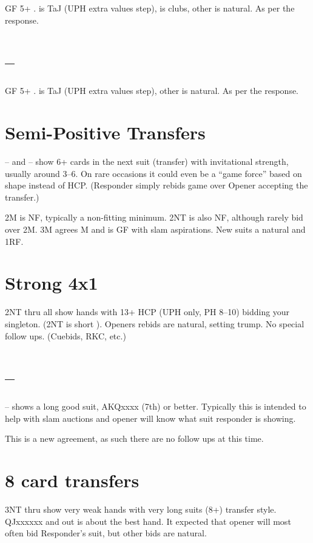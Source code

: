 \documentclass[tom-ari]{subfile}
\begin{document}
	
	GF 5+ \heartsuit.   is TaJ (UPH extra values step),  is clubs, other is natural.  As per the  response.
	
	\section[1C--2C]{--}
	
	
	GF 5+ \diamondsuit.   is TaJ (UPH extra values step), other is natural.  As per the  response. 
	
	\section{Semi-Positive Transfers}
	
	-- and -- show 6+ cards in the next suit (transfer) with invitational strength, usually around 3--6.  On rare occasions it could even be a ``game force'' based on shape instead of HCP.  (Responder simply rebids game over Opener accepting the transfer.)
	
	2M is NF, typically a non-fitting minimum.  2NT is also NF, although rarely bid over 2M.  3M agrees M and is GF with slam aspirations. New suits a natural and 1RF.
	
	\section{Strong 4x1}
	
	2NT thru  all show  hands with 13+ HCP (UPH only, PH 8--10) bidding your singleton. (2NT is short \spadesuit). Openers rebids are natural, setting trump.  No special follow ups.  (Cuebids, RKC, etc.)
	  
 	\section[1C--3S]{--}
 	
 	-- shows a long good suit, AKQxxxx (7th) or better.  Typically this is intended to help with slam auctions and opener will know what suit responder is showing.
 	
 	This is a new agreement, as such there are no follow ups at this time.
 	
 	\section{8 card transfers}
 	
 	3NT thru  show very weak hands with very long suits (8+) transfer style.  QJxxxxxx and out is about the best hand.  It expected that opener will most often bid Responder's suit, but other bids are natural.
 	
\end{document}
